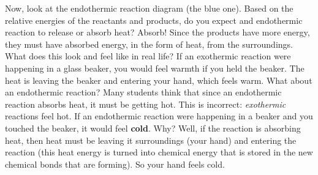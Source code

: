 Now, look at the endothermic reaction diagram (the blue one). Based on the
relative energies of the reactants and products, do you expect and endothermic
reaction to release or absorb heat? Absorb! Since the products have more
energy, they must have absorbed energy, in the form of heat, from the surroundings.
What does this look and feel like in real life? If an exothermic reaction were
happening in a glass beaker, you would feel warmth if you held the beaker. The
heat is leaving the beaker and entering your hand, which feels warm. What
about an endothermic reaction? Many students think that since an endothermic
reaction absorbs heat, it must be getting hot. This is incorrect:
\textit{exothermic} reactions feel hot. If an endothermic reaction were
happening in a beaker and you touched the beaker, it would feel \textbf{cold}.
Why? Well, if the reaction is absorbing heat, then heat must be leaving it
surroundings (your hand) and entering the reaction (this heat energy is turned
into chemical energy that is stored in the new chemical bonds that are
forming). So your hand feels cold. %
